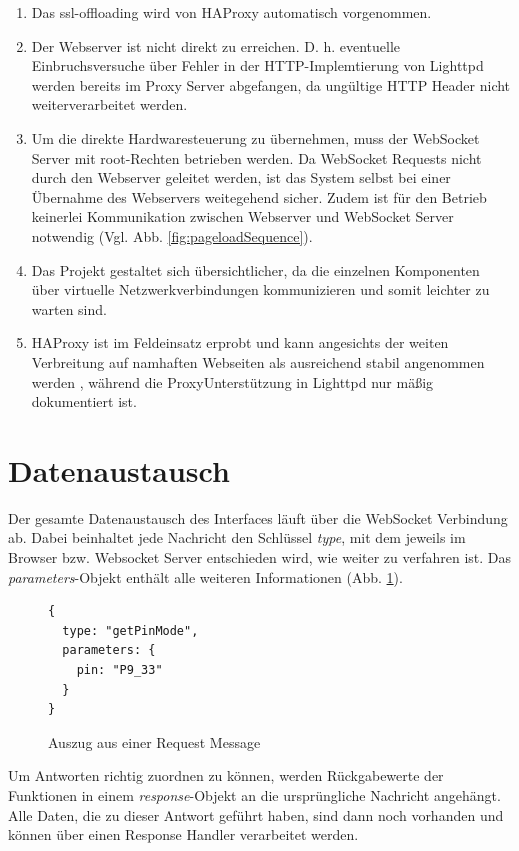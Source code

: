 \begin{enumerate}
\item Das \gls{ssl-offloading} wird von HAProxy automatisch vorgenommen.
\item Der Webserver ist nicht direkt zu erreichen. D. h. eventuelle Einbruchsversuche über Fehler in der HTTP-Implemtierung von Lighttpd werden bereits im Proxy Server abgefangen, da ungültige HTTP Header nicht weiterverarbeitet werden.
\item Um die direkte Hardwaresteuerung zu übernehmen, muss der WebSocket Server mit root-Rechten betrieben werden. Da WebSocket Requests nicht durch den Webserver geleitet werden, ist das System selbst bei einer Übernahme des Webservers weitegehend sicher. Zudem ist für den Betrieb keinerlei Kommunikation zwischen Webserver und WebSocket Server notwendig (Vgl. Abb. \ref{fig:pageloadSequence}).
\item Das Projekt gestaltet sich übersichtlicher, da die einzelnen Komponenten über virtuelle Netzwerkverbindungen kommunizieren und somit leichter zu warten sind.   
\item HAProxy ist im Feldeinsatz erprobt und kann angesichts der weiten Verbreitung auf namhaften Webseiten als ausreichend stabil angenommen werden \cite{kuehnast2014}, während die ProxyUnterstützung in Lighttpd nur mäßig dokumentiert ist.
\end{enumerate}


\section{Datenaustausch}
Der gesamte Datenaustausch des Interfaces läuft über die WebSocket Verbindung ab. Dabei beinhaltet jede Nachricht den Schlüssel \textit{type}, mit dem jeweils im Browser bzw. Websocket Server entschieden wird, wie weiter zu verfahren ist. Das \textit{parameters}-Objekt enthält alle weiteren Informationen (Abb. \ref{lst:requestMessage}).\\

\begin{figure}[ht]
\begin{lstlisting}
{
  type: "getPinMode",
  parameters: {
    pin: "P9_33"
  }
}
\end{lstlisting}
\caption{Auszug aus einer Request Message}
\label{lst:requestMessage}
\end{figure}

Um Antworten richtig zuordnen zu können, werden Rückgabewerte der Funktionen in einem \textit{response}-Objekt an die ursprüngliche Nachricht angehängt. Alle Daten, die zu dieser Antwort geführt haben, sind dann noch vorhanden und können über einen Response Handler verarbeitet werden.\\

